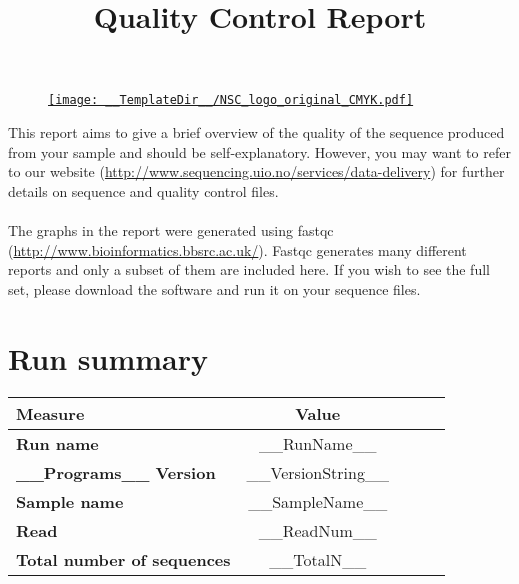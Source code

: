 \documentclass[a4paper, 12pt]{article}
\begin{document}
\begin{figure}
\centering
\href{http://www.sequencing.uio.no/}{\texttt{[image: \_\_TemplateDir\_\_/NSC\_logo\_original\_CMYK.pdf]}}
\end{figure}

\title{\bf \Huge Quality Control Report}
\maketitle
This report aims to give a brief overview of the quality of the sequence produced from your sample and should be self-explanatory. However, you may want to refer to our website (\href{http://www.sequencing.uio.no/services/data-delivery}{http://www.sequencing.uio.no/services/data-delivery}) for further details on sequence and quality control files.
\\
\\
The graphs in the report were generated using fastqc (\href{http://www.bioinformatics.bbsrc.ac.uk/projects/fastqc/} {http://www.bioinformatics.bbsrc.ac.uk/}). Fastqc generates many different reports and only a subset of them are included here. If you wish to see the full set, please download the software and run it on your sequence files.

\section{Run summary}
\begin{center}
\begin{table}[H]
\centering
\begin{tabular}{lclcl}
\toprule
{\bf Measure} &{\bf Value}\\
\midrule
{\bf Run name} & __RunName__\\
{\bf __Programs__ Version} & __VersionString__\\
{\bf Sample name} & __SampleName__ \\
{\bf Read} & __ReadNum__ \\
{\bf Total number of sequences} & __TotalN__\\
\bottomrule
\end{tabular}
\end{table}
\end{center}
\end{document}
